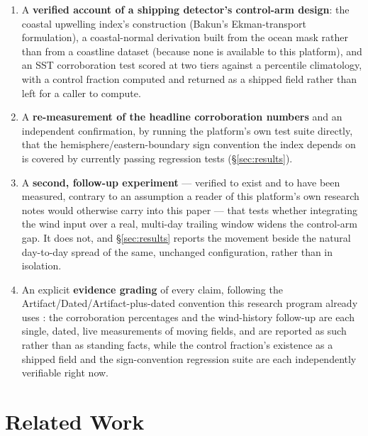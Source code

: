 \begin{enumerate}\itemsep2pt
\item A \textbf{verified account of a shipping detector's control-arm
design}: the coastal upwelling index's construction (Bakun's Ekman-transport
formulation), a coastal-normal derivation built from the ocean mask rather
than from a coastline dataset (because none is available to this platform),
and an SST corroboration test scored at two tiers against a percentile
climatology, with a control fraction computed and returned as a shipped
field rather than left for a caller to compute.
\item A \textbf{re-measurement of the headline corroboration numbers} and an
independent confirmation, by running the platform's own test suite directly,
that the hemisphere/eastern-boundary sign convention the index depends on is
covered by \NTotalUpwellingTests{} currently passing regression tests
(\S\ref{sec:results}).
\item A \textbf{second, follow-up experiment} --- verified to exist and to
have been measured, contrary to an assumption a reader of this platform's
own research notes would otherwise carry into this paper --- that tests
whether integrating the wind input over a real, multi-day trailing window
widens the control-arm gap. It does not, and \S\ref{sec:results} reports the
movement beside the natural day-to-day spread of the same, unchanged
configuration, rather than in isolation.
\item An explicit \textbf{evidence grading} of every claim, following the
Artifact/Dated/Artifact-plus-dated convention this research program already
uses \citep{silentfailures2026}: the corroboration percentages and the
wind-history follow-up are each single, dated, live measurements of moving
fields, and are reported as such rather than as standing facts, while the
control fraction's existence as a shipped field and the sign-convention
regression suite are each independently verifiable right now.
\end{enumerate}

\section{Related Work}
\label{sec:related}

